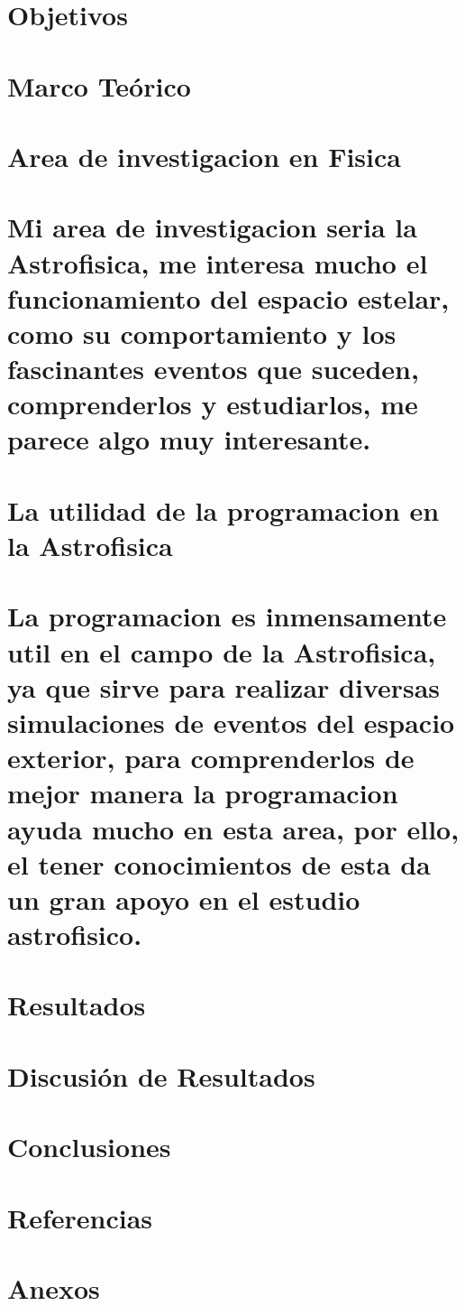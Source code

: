 \documentclass[12pt]{article}
\begin{document}
\section{Objetivos}

\section{Marco Teórico}

\section{Area de investigacion en Fisica}
\section{Mi area de investigacion seria la Astrofisica, me interesa mucho el funcionamiento del espacio estelar, como su comportamiento y 
los fascinantes eventos que suceden, comprenderlos y estudiarlos, me parece algo muy interesante.}

\section{La utilidad de la programacion en la Astrofisica}
\section{La programacion es inmensamente util en el campo de la Astrofisica, ya que sirve para realizar diversas simulaciones de eventos del espacio exterior,
para comprenderlos de mejor manera la programacion ayuda mucho en esta area, por ello, el tener conocimientos de esta da un gran apoyo en el estudio astrofisico.}

\section{Resultados}

\section{Discusión de Resultados}

\section{Conclusiones}

\section{Referencias}

\section{Anexos}
\end{document}
